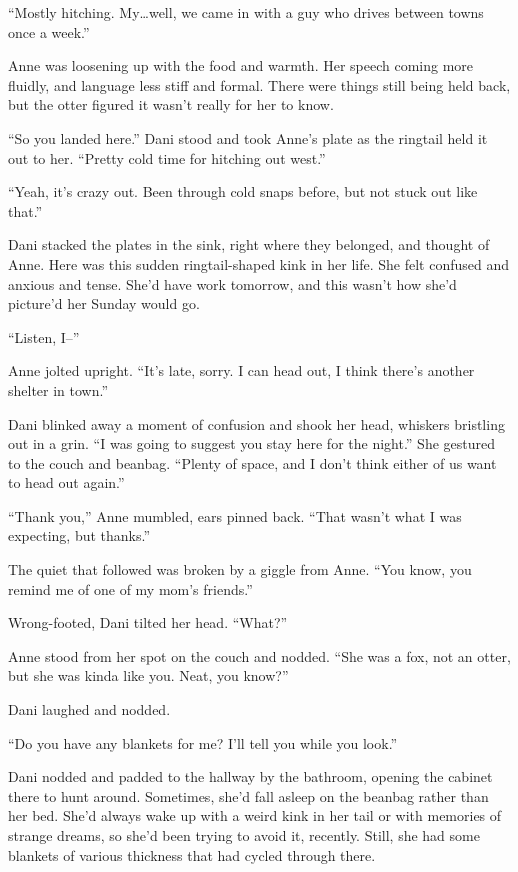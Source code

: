 ``Mostly hitching. My\ldots{}well, we came in with a guy who drives between towns once a week.''

Anne was loosening up with the food and warmth. Her speech coming more fluidly, and language less stiff and formal. There were things still being held back, but the otter figured it wasn't really for her to know.

``So you landed here.'' Dani stood and took Anne's plate as the ringtail held it out to her. ``Pretty cold time for hitching out west.''

``Yeah, it's crazy out. Been through cold snaps before, but not stuck out like that.''

Dani stacked the plates in the sink, right where they belonged, and thought of Anne. Here was this sudden ringtail-shaped kink in her life. She felt confused and anxious and tense. She'd have work tomorrow, and this wasn't how she'd picture'd her Sunday would go.

``Listen, I--''

Anne jolted upright. ``It's late, sorry. I can head out, I think there's another shelter in town.''

Dani blinked away a moment of confusion and shook her head, whiskers bristling out in a grin. ``I was going to suggest you stay here for the night.'' She gestured to the couch and beanbag. ``Plenty of space, and I don't think either of us want to head out again.''

``Thank you,'' Anne mumbled, ears pinned back. ``That wasn't what I was expecting, but thanks.''

The quiet that followed was broken by a giggle from Anne. ``You know, you remind me of one of my mom's friends.''

Wrong-footed, Dani tilted her head. ``What?''

Anne stood from her spot on the couch and nodded. ``She was a fox, not an otter, but she was kinda like you. Neat, you know?''

Dani laughed and nodded.

``Do you have any blankets for me? I'll tell you while you look.''

Dani nodded and padded to the hallway by the bathroom, opening the cabinet there to hunt around. Sometimes, she'd fall asleep on the beanbag rather than her bed. She'd always wake up with a weird kink in her tail or with memories of strange dreams, so she'd been trying to avoid it, recently. Still, she had some blankets of various thickness that had cycled through there.

